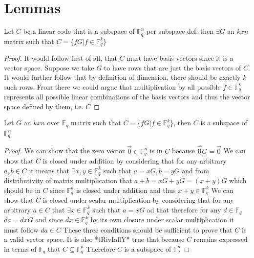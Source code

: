 \section{Lemmas}

\begin{lemma}
    Let $C$ be a linear code that is a subspace of $\mathbb{F}^{n}_{q}$ per subspace-def, then $\exists G$ an $kxn$ matrix such that $C=\{fG | f\in \mathbb{F}^{k}_{q}\}$
\end{lemma}

\begin{proof}
    It would follow first of all, that $C$ must have basis vectors since it is a vector space.
    Suppose we take $G$ to have rows that are just the basis vectors of $C$.
    It would further follow that by definition of dimension, there should be exactly $k$ such rows.
    From there we could argue that multiplication by all possible $f\in \mathbb{F}^{k}_{q}$ represents all possible linear combinations of the basis vectors and thus the vector space defined by them, i.e. $C$
\end{proof}

\begin{lemma}
    Let $G$ an $kxn$ over $\mathbb{F}_{q}$ matrix such that $C=\{fG | f\in \mathbb{F}^{k}_{q}\}$, then $C$ is a subspace of $\mathbb{F}^{n}_{q}$
\end{lemma}

\begin{proof}
    We can show that the zero vector $\vec{0}\in \mathbb{F}^{n}_{q}$ is in $C$ because $\vec{0}G=\vec{0}$
    We can show that $C$ is closed under addition by considering that for any arbitrary $a,b\in C$ it means that
        $\exists x,y\in \mathbb{F}^{k}_{q}$ such that $a=xG,b=yG$
        and from distributivity of matrix multiplication that $a+b=xG+yG=(x+y)G$ which should be in $C$ since
        $\mathbb{F}^{k}_{q}$ is closed under addition and thus $x+y\in \mathbb{F}^{k}_{q}$
    We can show that $C$ is closed under scalar multiplication by considering that for any arbitrary $a\in C$ that
        $\exists x\in \mathbb{F}^{k}_{q}$ such that $a=xG$ ad that therefore for any $d\in \mathbb{F}_{q}$
        $da=dxG$ and since $dx\in \mathbb{F}^{k}_{q}$ by its own closure under scalar multiplication it must follow $da\in C$
    These three conditions should be sufficient to prove that $C$ is a valid vector space.
    It is also *tRivIallY* true that because $C$ remains expressed in terms of $\mathbb{F}_{q}$ that $C\subseteq \mathbb{F}^{n}_{q}$
    Therefore $C$ is a subspace of $\mathbb{F}^{n}_{q}$
\end{proof}

